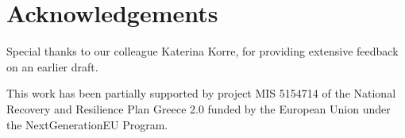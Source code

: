 %
\section{Acknowledgements}

Special thanks to our colleague Katerina Korre, for providing extensive feedback on an earlier draft.

This work has been partially supported by project MIS 5154714 of the National Recovery and Resilience Plan Greece 2.0 funded by the European Union under the NextGenerationEU Program.